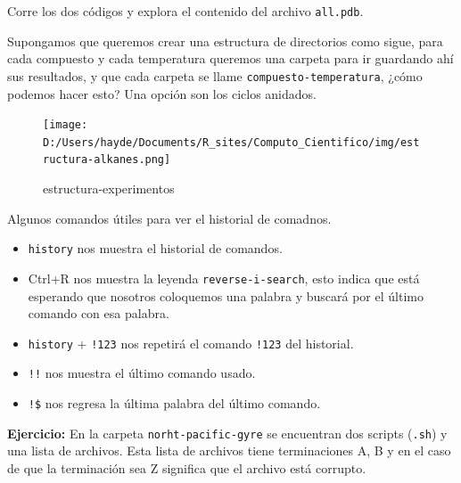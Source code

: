\documentclass[
]{book}
\newenvironment{Shaded}{\begin{snugshade}}{\end{snugshade}}
\newcommand{\ExtensionTok}[1]{#1}
\newcommand{\NormalTok}[1]{#1}
\newcommand{\OperatorTok}[1]{\textcolor[rgb]{0.81,0.36,0.00}{\textbf{#1}}}
\newcommand{\VariableTok}[1]{\textcolor[rgb]{0.00,0.00,0.00}{#1}}
\begin{document}
Corre los dos códigos y explora el contenido del archivo \texttt{all.pdb}.

Supongamos que queremos crear una estructura de directorios como sigue, para cada compuesto y cada temperatura queremos una carpeta para ir guardando ahí sus resultados, y que cada carpeta se llame \texttt{compuesto-temperatura}, ¿cómo podemos hacer esto? Una opción son los ciclos anidados.

\begin{figure}
\centering
\texttt{[image: D:/Users/hayde/Documents/R\_sites/Computo\_Cientifico/img/estructura-alkanes.png]}
\caption{estructura-experimentos}
\end{figure}

\begin{Shaded}
\end{Shaded}

Algunos comandos útiles para ver el historial de comadnos.

\begin{itemize}
\item
  \texttt{history} nos muestra el historial de comandos.
\item
  Ctrl+R nos muestra la leyenda \texttt{reverse-i-search}, esto indica que está esperando que nosotros coloquemos una palabra y buscará por el último comando con esa palabra.
\item
  \texttt{history} + \texttt{!123} nos repetirá el comando \texttt{!123} del historial.
\item
  \texttt{!!} nos muestra el último comando usado.
\item
  \texttt{!\$} nos regresa la última palabra del último comando.
\end{itemize}

\textbf{Ejercicio:} En la carpeta \texttt{norht-pacific-gyre} se encuentran dos scripts (\texttt{.sh}) y una lista de archivos. Esta lista de archivos tiene terminaciones A, B y en el caso de que la terminación sea Z significa que el archivo está corrupto.
\end{document}
